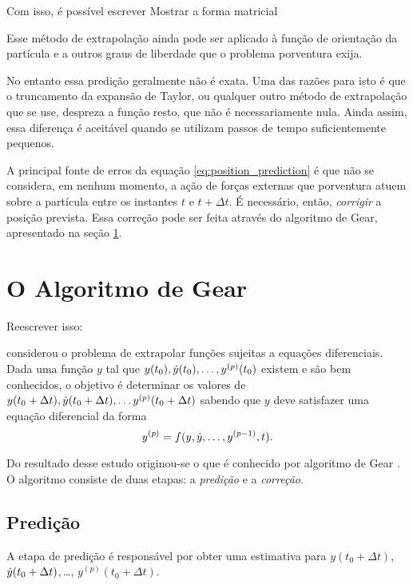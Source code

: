 Com isso, é possível escrever \alert{Mostrar a forma matricial}

Esse método de extrapolação ainda pode ser aplicado à função de orientação da partícula e a outros graus de liberdade que o problema porventura exija.

No entanto essa predição geralmente não é exata. Uma das razões para isto é que o truncamento da expansão de Taylor, ou qualquer outro método de extrapolação que se use, despreza a função resto, que não é necessariamente nula. Ainda assim, essa diferença é aceitável quando se utilizam passos de tempo suficientemente pequenos. 

A principal fonte de erros da equação \eqref{eq:position_prediction} é que não se considera, em nenhum momento, a ação de forças externas que porventura atuem sobre a partícula entre os instantes \(t\) e \(t + \Delta t\). É necessário, então, \textit{corrigir} a posição prevista. Essa correção pode ser feita através do algoritmo de Gear, apresentado na seção \ref{sec:gear_integration_scheme}.

\section{O Algoritmo de Gear} \label{sec:gear_integration_scheme}

\alert{Reescrever isso:}

 considerou o problema de extrapolar funções sujeitas a equações diferenciais. Dada uma função \(y\) tal que \(y(t_0), \deriv{1}{y}(t_0),\dots, y^{(p)}(t_0)\) existem e são bem conhecidos, o objetivo é determinar os valores de \(y(t_0 + \Delta t), \deriv{1}{y}(t_0 + \Delta t),\dots y^{(p)}(t_0 + \Delta t)\) sabendo que \(y\) deve satisfazer uma equação diferencial da forma
\begin{equation*}
	y^{(p)} = f(y, \deriv{1}{y},\dots,y^{(p-1)}, t).
\end{equation*}

Do resultado desse estudo originou-se o que é conhecido por algoritmo de Gear . O algoritmo consiste de duas etapas: a \textit{predição} e a \textit{correção}.

\subsection{Predição}

A etapa de predição é responsável por obter uma estimativa para \(y(t_0 + \Delta t)\), \(\deriv{1}{y}(t_0 + \Delta t)\),\,\dots, \(y^{(p)}(t_0 + \Delta t)\).

